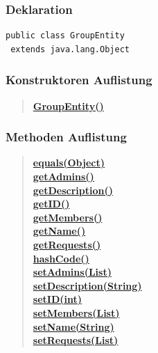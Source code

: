 \documentclass[11pt,a4paper]{article}
\begin{document}
{{{\subsubsection{Deklaration}{
\begin{lstlisting}[frame=none]
public class GroupEntity
 extends java.lang.Object\end{lstlisting}
\subsubsection{Konstruktoren Auflistung}{
\begin{verse}
\hyperlink{edu.kit.pse17.go_app.PersistenceLayer.GroupEntity()}{{\bf GroupEntity()}} \\
\end{verse}
}
\subsubsection{Methoden Auflistung}{
\begin{verse}
\hyperlink{edu.kit.pse17.go_app.PersistenceLayer.GroupEntity.equals(java.lang.Object)}{{\bf equals(Object)}} \\
\hyperlink{edu.kit.pse17.go_app.PersistenceLayer.GroupEntity.getAdmins()}{{\bf getAdmins()}} \\
\hyperlink{edu.kit.pse17.go_app.PersistenceLayer.GroupEntity.getDescription()}{{\bf getDescription()}} \\
\hyperlink{edu.kit.pse17.go_app.PersistenceLayer.GroupEntity.getID()}{{\bf getID()}} \\
\hyperlink{edu.kit.pse17.go_app.PersistenceLayer.GroupEntity.getMembers()}{{\bf getMembers()}} \\
\hyperlink{edu.kit.pse17.go_app.PersistenceLayer.GroupEntity.getName()}{{\bf getName()}} \\
\hyperlink{edu.kit.pse17.go_app.PersistenceLayer.GroupEntity.getRequests()}{{\bf getRequests()}} \\
\hyperlink{edu.kit.pse17.go_app.PersistenceLayer.GroupEntity.hashCode()}{{\bf hashCode()}} \\
\hyperlink{edu.kit.pse17.go_app.PersistenceLayer.GroupEntity.setAdmins(java.util.List)}{{\bf setAdmins(List)}} \\
\hyperlink{edu.kit.pse17.go_app.PersistenceLayer.GroupEntity.setDescription(java.lang.String)}{{\bf setDescription(String)}} \\
\hyperlink{edu.kit.pse17.go_app.PersistenceLayer.GroupEntity.setID(int)}{{\bf setID(int)}} \\
\hyperlink{edu.kit.pse17.go_app.PersistenceLayer.GroupEntity.setMembers(java.util.List)}{{\bf setMembers(List)}} \\
\hyperlink{edu.kit.pse17.go_app.PersistenceLayer.GroupEntity.setName(java.lang.String)}{{\bf setName(String)}} \\
\hyperlink{edu.kit.pse17.go_app.PersistenceLayer.GroupEntity.setRequests(java.util.List)}{{\bf setRequests(List)}} \\
\end{verse}
}
}}}}
\end{document}
